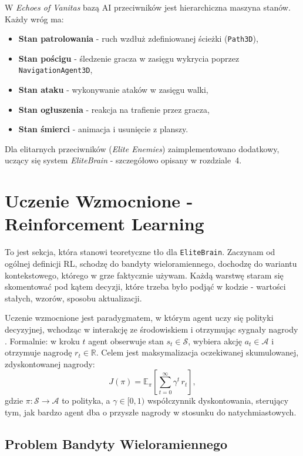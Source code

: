 W \textit{Echoes of Vanitas} bazą AI przeciwników jest hierarchiczna maszyna stanów. Każdy wróg ma:

\begin{itemize}
    \item \textbf{Stan patrolowania} - ruch wzdłuż zdefiniowanej ścieżki (\texttt{Path3D}),
    \item \textbf{Stan pościgu} - śledzenie gracza w zasięgu wykrycia poprzez \texttt{NavigationAgent3D},
    \item \textbf{Stan ataku} - wykonywanie ataków w zasięgu walki,
    \item \textbf{Stan ogłuszenia} - reakcja na trafienie przez gracza,
    \item \textbf{Stan śmierci} - animacja i usunięcie z planszy.
\end{itemize}

Dla elitarnych przeciwników (\textit{Elite Enemies}) zaimplementowano dodatkowy, uczący się system \textit{EliteBrain} - szczegółowo opisany w rozdziale~4.

\section{Uczenie Wzmocnione - Reinforcement Learning}

To jest sekcja, która stanowi teoretyczne tło dla \texttt{EliteBrain}. Zaczynam od ogólnej definicji RL, schodzę do bandyty wieloramiennego, dochodzę do wariantu kontekstowego, którego w grze faktycznie używam. Każdą warstwę staram się skomentować pod kątem decyzji, które trzeba było podjąć w kodzie - wartości stałych, wzorów, sposobu aktualizacji.

Uczenie wzmocnione jest paradygmatem, w którym agent uczy się polityki decyzyjnej, wchodząc w interakcję ze środowiskiem i otrzymując sygnały nagrody \cite{sutton2018rl}. Formalnie: w kroku $t$ agent obserwuje stan $s_t \in \mathcal{S}$, wybiera akcję $a_t \in \mathcal{A}$ i otrzymuje nagrodę $r_t \in \mathbb{R}$. Celem jest maksymalizacja oczekiwanej skumulowanej, zdyskontowanej nagrody:
\[
    J(\pi) = \mathbb{E}_\pi \!\left[\sum_{t=0}^{\infty} \gamma^t\, r_t\right],
\]
gdzie $\pi: \mathcal{S} \to \mathcal{A}$ to polityka, a $\gamma \in [0,1)$ współczynnik dyskontowania, sterujący tym, jak bardzo agent dba o przyszłe nagrody w stosunku do natychmiastowych.

\subsection{Problem Bandyty Wieloramiennego}

